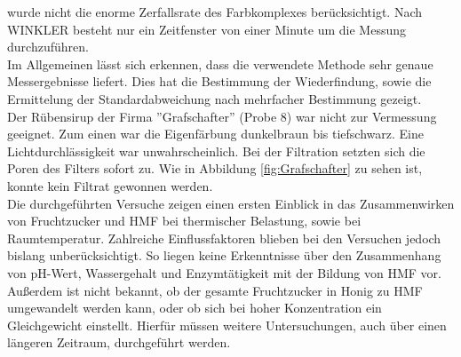 wurde nicht die enorme Zerfallsrate des Farbkomplexes berücksichtigt. 
Nach WINKLER besteht nur ein Zeitfenster von einer Minute um die Messung durchzuführen.~\cite{Winkler}\\
Im Allgemeinen lässt sich erkennen, dass die verwendete Methode sehr genaue Messergebnisse liefert. Dies hat die Bestimmung der Wiederfindung, sowie die Ermittelung der Standardabweichung nach mehrfacher Bestimmung gezeigt.\\
Der Rübensirup der Firma ''Grafschafter'' (Probe 8) war nicht zur Vermessung geeignet. Zum einen war die Eigenfärbung dunkelbraun bis tiefschwarz. Eine Lichtdurchlässigkeit war unwahrscheinlich. Bei der Filtration setzten sich die Poren des Filters sofort zu. Wie in Abbildung \ref{fig:Grafschafter} zu sehen ist, konnte kein Filtrat gewonnen werden.\\
Die durchgeführten Versuche zeigen einen ersten Einblick in das Zusammenwirken von Fruchtzucker und HMF bei thermischer Belastung, sowie bei Raumtemperatur. Zahlreiche Einflussfaktoren blieben bei den Versuchen jedoch bislang unberücksichtigt. So liegen keine Erkenntnisse über den Zusammenhang von pH-Wert, Wassergehalt und Enzymtätigkeit mit der Bildung von HMF vor. Außerdem ist nicht bekannt, ob der gesamte Fruchtzucker in Honig zu HMF umgewandelt werden kann, oder ob sich bei hoher Konzentration ein Gleichgewicht einstellt. Hierfür müssen weitere Untersuchungen, auch über einen längeren Zeitraum, durchgeführt werden.
